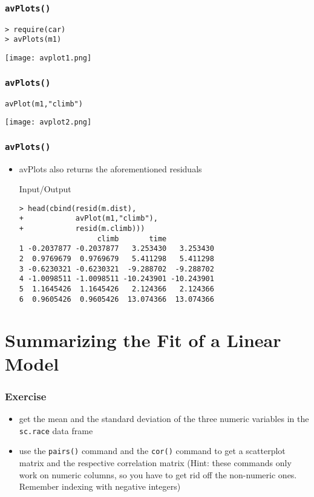 \begin{frame}[fragile]\frametitle{\texttt{avPlots()}}
\begin{verbatim}
> require(car)
> avPlots(m1)
\end{verbatim}
\begin{center}
\texttt{[image: avplot1.png]}
\end{center}
\end{frame}


\begin{frame}[fragile]\frametitle{\texttt{avPlots()}}
\begin{verbatim}
avPlot(m1,"climb")
\end{verbatim}
\begin{center}
\texttt{[image: avplot2.png]}
\end{center}
\end{frame}



\begin{frame}[fragile]\frametitle{\texttt{avPlots()}}
  \begin{itemize}
  \item avPlots also returns the aforementioned residuals
    \begin{exampleblock}{Input/Output}
\begin{verbatim}
> head(cbind(resid(m.dist),
+            avPlot(m1,"climb"),
+            resid(m.climb)))
                  climb       time           
1 -0.2037877 -0.2037877   3.253430   3.253430
2  0.9769679  0.9769679   5.411298   5.411298
3 -0.6230321 -0.6230321  -9.288702  -9.288702
4 -1.0098511 -1.0098511 -10.243901 -10.243901
5  1.1645426  1.1645426   2.124366   2.124366
6  0.9605426  0.9605426  13.074366  13.074366
\end{verbatim}
    \end{exampleblock}
  \end{itemize}
\end{frame}

\section{Summarizing the Fit of a Linear Model}
\begin{frame}\frametitle{Exercise}
  \begin{itemize}
  \item get the mean and the standard deviation of the three numeric variables in the \texttt{sc.race} data frame
  \item use the \texttt{pairs()} command and the \texttt{cor()} command to get a scatterplot matrix and the respective correlation matrix (Hint: these commands only work on numeric columns, so you have to get rid off the non-numeric ones. Remember indexing with negative integers)
  \end{itemize}
\end{frame}


